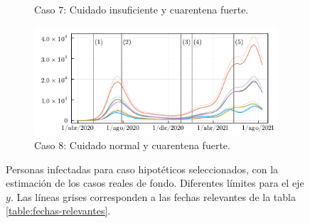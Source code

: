 \begin{figure}
\begin{subfigure}[b]{.47\textwidth}
         \caption{Caso \(7\): Cuidado insuficiente y cuarentena fuerte.}
         \label{img:esc-beta-chico-c7}
     \end{subfigure}
     \hfill
     \begin{subfigure}[b]{.47\textwidth}
         \centering
         \includegraphics[width=\textwidth]{img/resultados/comparecase_8withnormal_I_gamma_e_0-1724_gamma_i_0-0833_beta_2_2-0000.pdf}
         \caption{Caso \(8\): Cuidado normal y cuarentena fuerte.}
         \label{img:esc-beta-chico-c8}
     \end{subfigure}
     \hfill
    \begin{subfigure}[b]{0.99\textwidth}
    \centering
    \scalebox{0.6}{
    
    }
    \end{subfigure}
        \caption[Personas infectadas para caso hipotéticos seleccionados.]{Personas infectadas para caso hipotéticos seleccionados, con la estimación de los casos reales de fondo. Diferentes límites para el eje \(y\). Las líneas grises corresponden a las fechas relevantes de la tabla \ref{table:fechas-relevantes}.}
        \label{img:hip-3478-I-comp-beta1-2}
\end{figure}
